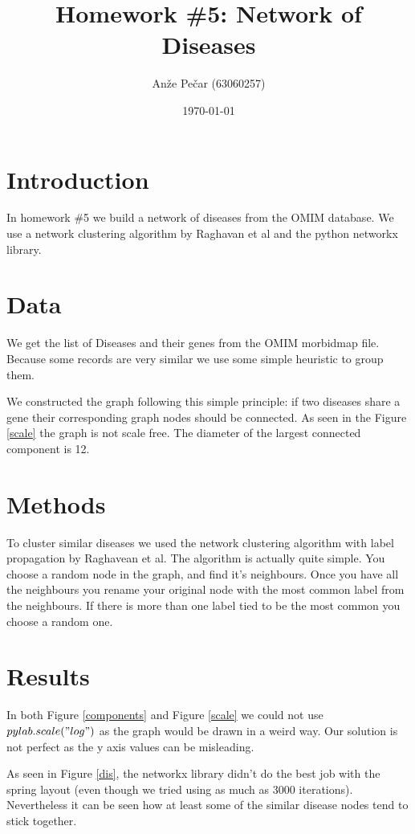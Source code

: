 \documentclass[a4paper,11pt]{article}
\title{Homework \#5: Network of Diseases}
\author{Anže Pečar (63060257)}
\date{\today}
\begin{document}
\maketitle

\section{Introduction}

In homework \#5 we build a network of diseases from the OMIM database. We use a network clustering algorithm by Raghavan et al and the python networkx library.

\section{Data}

We get the list of Diseases and their genes from the OMIM morbidmap file. Because some records are very similar we use some simple heuristic to group them. 

We constructed the graph following this simple principle: if two diseases share a gene their corresponding graph nodes should be connected. As seen in the Figure \ref{scale} the graph is not scale free. The diameter of the largest connected component is 12.

\section{Methods}

To cluster similar diseases we used  the network clustering algorithm with label propagation by Raghavean et al. The algorithm is actually quite simple. You choose a random node in the graph, and find it's neighbours. Once you have all the neighbours you rename your original node with the most common label from the neighbours. If there is more than one label tied to be the most common you choose a random one.

\section{Results}
In both Figure \ref{components} and Figure \ref{scale} we could not use $pylab.scale("log")$ as the graph would be drawn in a weird way. Our solution is not perfect as the y axis values can be misleading.

As seen in Figure \ref{dis}, the networkx library didn't do the best job with the spring layout (even though we tried using as much as 3000 iterations). Nevertheless it can be seen how at least some of the similar disease nodes tend to stick together.
\end{document}
